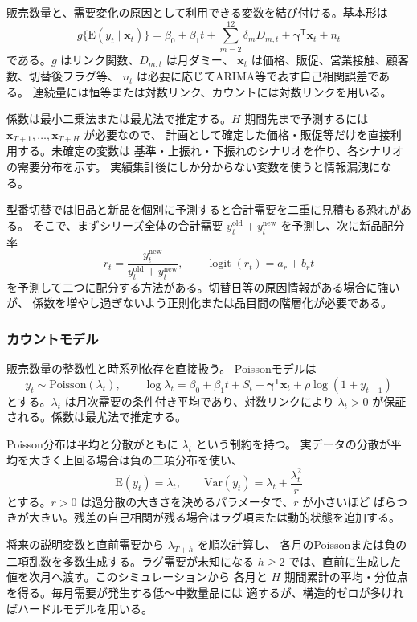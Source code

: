 \documentclass[a4paper,11pt]{jsarticle}
\begin{document}
販売数量と、需要変化の原因として利用できる変数を結び付ける。基本形は
\[
g\{\mathrm{E}(y_t\mid\boldsymbol{x}_t)\}
=\beta_0+\beta_1t+\sum_{m=2}^{12}\delta_mD_{m,t}
+\boldsymbol{\gamma}^{\mathsf T}\boldsymbol{x}_t+n_t
\]
である。$g$ はリンク関数、$D_{m,t}$ は月ダミー、
$\boldsymbol{x}_t$ は価格、販促、営業接触、顧客数、切替後フラグ等、
$n_t$ は必要に応じてARIMA等で表す自己相関誤差である。
連続量には恒等または対数リンク、カウントには対数リンクを用いる。

係数は最小二乗法または最尤法で推定する。$H$ 期間先まで予測するには
$\boldsymbol{x}_{T+1},\ldots,\boldsymbol{x}_{T+H}$ が必要なので、
計画として確定した価格・販促等だけを直接利用する。未確定の変数は
基準・上振れ・下振れのシナリオを作り、各シナリオの需要分布を示す。
実績集計後にしか分からない変数を使うと情報漏洩になる。

型番切替では旧品と新品を個別に予測すると合計需要を二重に見積もる恐れがある。
そこで、まずシリーズ全体の合計需要 $y_t^{\mathrm{old}}+y_t^{\mathrm{new}}$
を予測し、次に新品配分率
\[
r_t=\frac{y_t^{\mathrm{new}}}
{y_t^{\mathrm{old}}+y_t^{\mathrm{new}}},\qquad
\operatorname{logit}(r_t)=a_r+b_rt
\]
を予測して二つに配分する方法がある。切替日等の原因情報がある場合に強いが、
係数を増やし過ぎないよう正則化または品目間の階層化が必要である。

\subsubsection{カウントモデル}

販売数量の整数性と時系列依存を直接扱う\cite{davis2003count}。
Poissonモデルは
\[
y_t\sim\mathrm{Poisson}(\lambda_t),\qquad
\log\lambda_t=\beta_0+\beta_1t+S_t+
\boldsymbol{\gamma}^{\mathsf T}\boldsymbol{x}_t+
\rho\log(1+y_{t-1})
\]
とする。$\lambda_t$ は月次需要の条件付き平均であり、対数リンクにより
$\lambda_t>0$ が保証される。係数は最尤法で推定する。

Poisson分布は平均と分散がともに $\lambda_t$ という制約を持つ。
実データの分散が平均を大きく上回る場合は負の二項分布を使い、
\[
\mathrm{E}(y_t)=\lambda_t,\qquad
\mathrm{Var}(y_t)=\lambda_t+\frac{\lambda_t^2}{r}
\]
とする。$r>0$ は過分散の大きさを決めるパラメータで、$r$ が小さいほど
ばらつきが大きい。残差の自己相関が残る場合はラグ項または動的状態を追加する。

将来の説明変数と直前需要から $\lambda_{T+h}$ を順次計算し、
各月のPoissonまたは負の二項乱数を多数生成する。ラグ需要が未知になる
$h\geq2$ では、直前に生成した値を次月へ渡す。このシミュレーションから
各月と $H$ 期間累計の平均・分位点を得る。毎月需要が発生する低～中数量品には
適するが、構造的ゼロが多ければハードルモデルを用いる。
\end{document}
